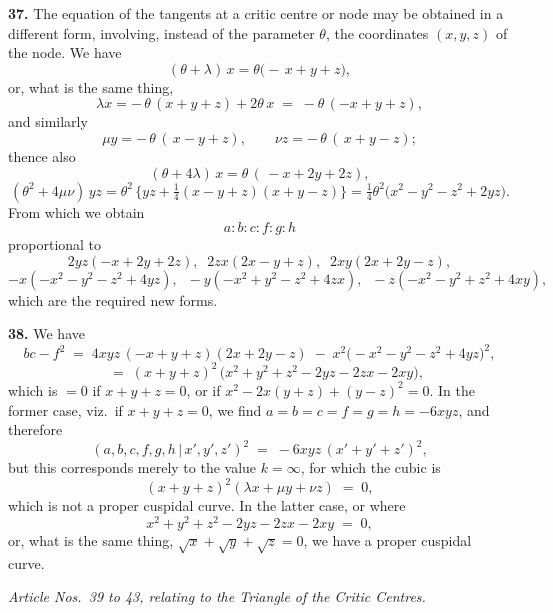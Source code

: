 \documentclass[11pt,a4paper]{article}
\providecommand{\mid}{\,|\,}
\begin{document}
\medskip

\textbf{37.} The equation of the tangents at a critic centre or node may be obtained in a different form, involving, instead of the parameter $\theta$, the coordinates $(x, y, z)$ of the node. We have
\[
(\theta + \lambda)\,x = \theta\bigl(-\,x + y + z\bigr),
\]
or, what is the same thing,
\[
\lambda x = -\,\theta\,(x + y + z) + 2\theta\,x \;=\; -\theta\,(-x + y + z),
\]
and similarly
\[
\mu y = -\,\theta\,(\,x - y + z), \qquad \nu z = -\,\theta\,(\,x + y - z);
\]
thence also
\[
(\theta + 4\lambda)\,x = \theta\,(\,-x + 2y + 2z),
\]
\[
(\theta^{2} + 4\mu\nu)\,yz = \theta^{2}\,\bigl\{yz + \tfrac{1}{4}(x - y + z)(x + y - z)\bigr\} = \tfrac{1}{4}\theta^{2}\bigl(x^{2} - y^{2} - z^{2} + 2yz\bigr).
\]
From which we obtain
\[
a : b : c : f : g : h
\]
proportional to
\[
2yz(-x + 2y + 2z),\;\; 2zx(2x - y + z),\;\; 2xy(2x + 2y - z),
\]
\[
-x(-x^{2} - y^{2} - z^{2} + 4yz),\;\; -y(-x^{2} + y^{2} - z^{2} + 4zx),\;\; -z(-x^{2} - y^{2} + z^{2} + 4xy),
\]
which are the required new forms.

\medskip

\textbf{38.} We have
\[
bc - f^{2} \;=\; 4xyz\,(-x + y + z)(2x + 2y - z) \;-\; x^{2}\bigl(-x^{2} - y^{2} - z^{2} + 4yz\bigr)^{2},
\]
\[
\quad=\;(x+y+z)^{2}\,\bigl(x^{2} + y^{2} + z^{2} - 2yz - 2zx - 2xy\bigr),
\]
which is $=0$ if $x+y+z=0$, or if $x^{2}-2x(y+z)+(y-z)^{2}=0$. In the former case, viz.\ if $x+y+z=0$, we find $a=b=c=f=g=h=-6xyz$, and therefore
\[
(a,b,c,f,g,h\mid x',y',z')^{2} \;=\; -6xyz\,(x'+y'+z')^{2},
\]
but this corresponds merely to the value $k=\infty$, for which the cubic is
\[
(x+y+z)^{2}(\lambda x + \mu y + \nu z) \;=\; 0,
\]
which is not a proper cuspidal curve. In the latter case, or where
\[
x^{2} + y^{2} + z^{2} - 2yz - 2zx - 2xy \;=\; 0,
\]
or, what is the same thing, $\sqrt{x}+\sqrt{y}+\sqrt{z}=0$, we have a proper cuspidal curve.

\medskip

\noindent\textit{Article Nos.\ 39 to 43, relating to the Triangle of the Critic Centres.}

\medskip
\end{document}
